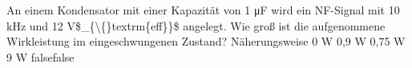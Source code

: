     {An einem Kondensator mit einer Kapazität von 1 μF wird ein NF-Signal mit 10 kHz und 12 V\$\_\{\textbackslash\{\}textrm\{eff\}\}\$ angelegt. Wie groß ist die aufgenommene Wirkleistung im eingeschwungenen Zustand?}
    {Näherungsweise 0 W}
    {0,9 W}
    {0,75 W}
    {9 W}
    {false}{false}